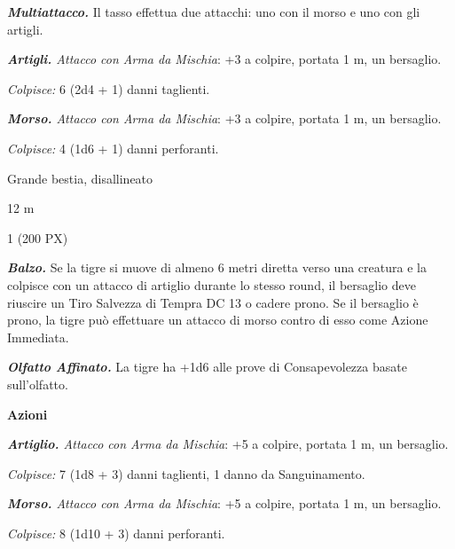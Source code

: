 \begin{multicols}{2}
{\emph{\textbf{Multiattacco.}} Il tasso effettua due attacchi: uno con il morso e uno con gli artigli.

\emph{\textbf{Artigli.} Attacco con Arma da Mischia}: +3 a colpire, portata 1 m, un bersaglio.

\emph{Colpisce:} 6 (2d4 + 1) danni taglienti.

\emph{\textbf{Morso.} Attacco con Arma da Mischia}: +3 a colpire, portata 1 m, un bersaglio.

\emph{Colpisce:} 4 (1d6 + 1) danni perforanti.

\begin{description}[noitemsep, topsep=0pt, parsep=0pt, partopsep=0pt, itemsep=1pt, leftmargin=2.35cm,  labelwidth=2.2cm, itemindent=0cm, listparindent=0pt] %
\setlength{\baselineskip}{10pt}
\item[\textbf{Taglia/Tipo}] Grande bestia, disallineato
\item[\textbf{Caratt.}] 
\item[\textbf{Punti Ferita}] 
\item[\textbf{Tiri Salvez.}] 
\item[\textbf{Movimento}] 12 m
\item[\textbf{Sfida}] 1 (200 PX)
\end{description}
\smallskip

\emph{\textbf{Balzo.}} Se la tigre si muove di almeno 6 metri diretta verso una creatura e la colpisce con un attacco di artiglio durante lo stesso round, il bersaglio deve riuscire un Tiro Salvezza di Tempra DC 13 o cadere prono. Se il bersaglio è prono, la tigre può effettuare un attacco di morso contro di esso come Azione Immediata.

\emph{\textbf{Olfatto Affinato.}} La tigre ha +1d6 alle prove di Consapevolezza basate sull'olfatto.

\textbf{Azioni}

\emph{\textbf{Artiglio.} Attacco con Arma da Mischia}: +5 a colpire, portata 1 m, un bersaglio.

\emph{Colpisce:} 7 (1d8 + 3) danni taglienti, 1 danno da Sanguinamento.

\emph{\textbf{Morso.} Attacco con Arma da Mischia}: +5 a colpire, portata 1 m, un bersaglio.

\emph{Colpisce:} 8 (1d10 + 3) danni perforanti.

}
\end{multicols}
